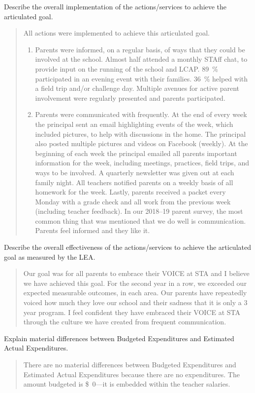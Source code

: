 \documentclass{article}
\newcommand{\dollar}[1]{\SI{#1}[\$]{}}
\newcounter{goal}[section]
\newcounter{action}[goal]
\newenvironment{actionanalysis}
	{
		\begin{enumerate}[label={\bf Action \theenumi:}]
	}
	{\end{enumerate}}
\begin{document}
Describe the overall implementation of the actions/services to achieve the articulated goal.
\begin{quote}
	All actions were implemented to achieve this articulated goal.
	\begin{actionanalysis}
	\item Parents were informed, on a regular basis, of ways that they could be involved at the school. Almost half attended a monthly STAff chat, to provide input on the running of the school and LCAP. \SI{89}{\percent} participated in an evening event with their families. \SI{36}{\percent} helped with a field trip and/or challenge day. Multiple avenues for active parent involvement were regularly presented and parents participated.
	\item Parents were communicated with frequently. At the end of every week the principal sent an email highlighting events of the week, which included pictures, to help with discussions in the home. The principal also posted multiple pictures and videos on Facebook (weekly). At the beginning of each week the principal emailed all parents important information for the week, including meetings, practices, field trips, and ways to be involved. A quarterly newsletter was given out at each family night. All teachers notified parents on a weekly basis of all homework for the week. Lastly, parents received a packet every Monday with a grade check and all work from the previous week (including teacher feedback). In our 2018--19 parent survey, the most common thing that was mentioned that we do well is communication. Parents feel informed and they like it.
	\end{actionanalysis}
\end{quote}

Describe the overall effectiveness of the actions/services to achieve the articulated goal as measured by the LEA.
\begin{quote}
	Our goal was for all parents to embrace their VOICE at STA and I believe we have achieved this goal. For the second year in a row, we exceeded our expected measurable outcomes, in each area. Our parents have repeatedly voiced how much they love our school and their sadness that it is only a 3 year program. I feel confident they have embraced their VOICE at STA through the culture we have created from frequent communication.
\end{quote}

Explain material differences between Budgeted Expenditures and Estimated Actual Expenditures.
\begin{quote}
	There are no material differences between Budgeted Expenditures and Estimated Actual Expenditures because there are no expenditures. The amount budgeted is \dollar{0}---it is embedded within the teacher salaries.
\end{quote}
\end{document}

